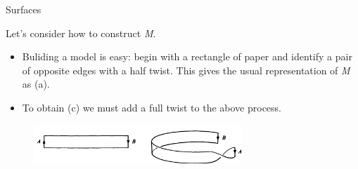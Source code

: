 \documentclass{beamer}
\begin{document}
\begin{frame}{Surfaces}
  \begin{block}{}
    Let's consider how to construct \textsl{M}.
    \begin{itemize}
    \item Buliding a model is easy: begin with a rectangle of paper and identify a pair of opposite edges with a half twist. This gives the usual representation of \textsl{M} as (a).
    \item To obtain (c) we must add a full twist to the above process.
    \end{itemize}
  \end{block}
  \begin{figure}
    \centering
    \includegraphics[width=0.7\textwidth]{figure_1_15.png}
    \caption{}
  \end{figure}
\end{frame}
\end{document}
